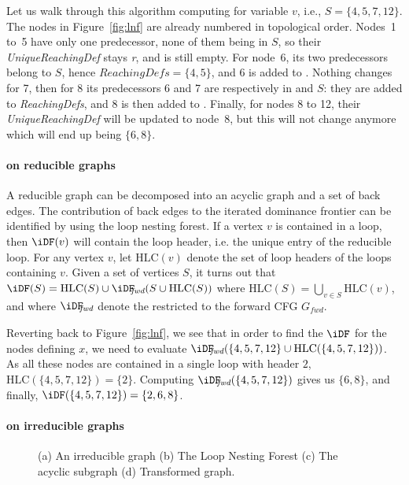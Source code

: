 {Let us walk through this algorithm computing \iDF for variable $v$, i.e., $S = \{4,5,7,12\}$. 
The nodes in Figure~\ref{fig:lnf} are already numbered in topological order. 
Nodes~1 to~5 have only one predecessor, none of them being in $S$, so their \textit{UniqueReachingDef} stays \textit{r}, and \iDF is still empty. 
For node~6, its two predecessors belong to $S$, hence $\textit{ReachingDefs} = \{4,5\}$, and 6 is added to \iDF. 
Nothing changes for 7, then for 8 its predecessors 6 and 7 are respectively in \iDF and $S$: 
they are added to \textit{ReachingDefs}, and 8 is then added to \iDF. 
Finally, for nodes 8 to 12, their \textit{UniqueReachingDef} will be updated to node~8, but this will not change \iDF anymore which will end up being $\{6,8\}$.

\paragraph{\iDF on reducible graphs}

{
 \def\HLC{\mbox{HLC}} A reducible graph can be decomposed into an acyclic graph and a set of back edges. 
The contribution of back edges to the iterated dominance frontier can be identified by using the loop nesting forest. 
If a vertex $v$ is contained in a loop, then $\iDF(v)$ will contain the loop header, i.e.    the unique entry of the reducible loop. 
For any vertex $v$, let $\HLC(v)$ denote the set of loop headers of the loops containing $v$. 
Given a set of vertices $S$, it turns out that $\iDF(S) = \HLC(S) \cup \iDFfwd(S \cup \HLC(S))$ where $\HLC(S)=\bigcup_{v\in S} \HLC(v)$, and where $\iDFfwd$ denote the \iDF restricted to the forward CFG $G_{\textit{fwd}}$.

Reverting back to Figure~\ref{fig:lnf}, we see that in order to find the $\iDF$ for the nodes defining $x$, we need to evaluate $\iDFfwd(\{4,5,7,12\} \cup \HLC(\{4,5,7,12\}))$. 
As all these nodes are contained in a single loop with header $2$, $\HLC(\{4,5,7,12\}) = \{2\}$. 
Computing $\iDFfwd(\{4,5,7,12\})$ gives us $\{6,8\}$, and finally, $\iDF(\{4,5,7,12\}) = \{2,6,8\}$. 
}

\paragraph{\iDF on irreducible graphs}

\begin{figure}[t]
  \hfill
  \hfill
  \hfill
  \caption{(a) An irreducible graph (b) The Loop Nesting Forest (c) The acyclic 
    subgraph (d) Transformed graph.}
  \label{fig:irred}
\end{figure} 



}
